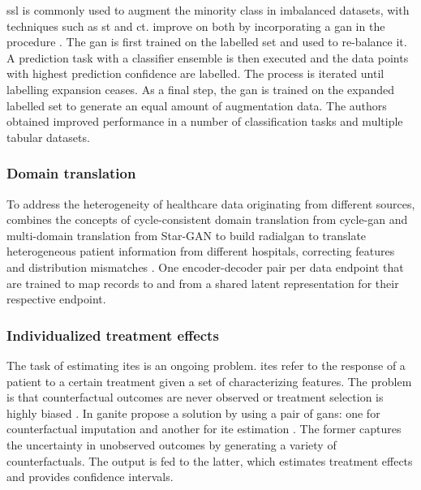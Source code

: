             
            \Gls{ssl} is commonly used to augment the minority class in imbalanced datasets, with techniques such as \gls{st} and \gls{ct}. \citeauthor{yang2018unpaired} improve on both by incorporating a \gls{gan} in the procedure \cite{yang2018unpaired}. The \gls{gan} is first trained on the labelled set and used to re-balance it. A prediction task with a classifier ensemble is then executed and the data points with highest prediction confidence are labelled. The process is iterated until labelling expansion ceases. As a final step, the \gls{gan} is trained on the expanded labelled set to generate an equal amount of augmentation data. The authors obtained improved performance in a number of classification tasks and multiple tabular datasets.
    
    \subsubsection{Domain translation}
    
        To address the heterogeneity of healthcare data originating from different sources, \citeauthor{Yoon2018-radial} combines the concepts of cycle-consistent domain translation from \gls{cycle-gan} \cite{Zhu_2017} and  multi-domain translation from Star-GAN \cite{choi2017stargan} to build \gls{radialgan} to translate heterogeneous patient information from different hospitals, correcting features and distribution mismatches \cite{Yoon2018-radial}. One encoder-decoder pair per data endpoint that are trained to map records to and from a shared latent representation for their respective endpoint. 
    
    \subsubsection{Individualized treatment effects}
    
        The task of estimating \glspl{ite} is an ongoing problem. \glspl{ite} refer to the response of a patient to a certain treatment given a set of characterizing features. The problem is that counterfactual outcomes are never observed or treatment selection is highly biased \cite{Yoon2018-ite, mcdermott2018semi, walsh2020generating}. In \gls{ganite} \citeauthor{Yoon2018-ite} propose a solution by using a pair of \glspl{gan}: one for counterfactual imputation and another for \gls{ite} estimation \cite{Yoon2018-ite}. The former captures the uncertainty in unobserved outcomes by generating a variety of counterfactuals. The output is fed to the latter, which estimates treatment effects and provides confidence intervals.\par
    
